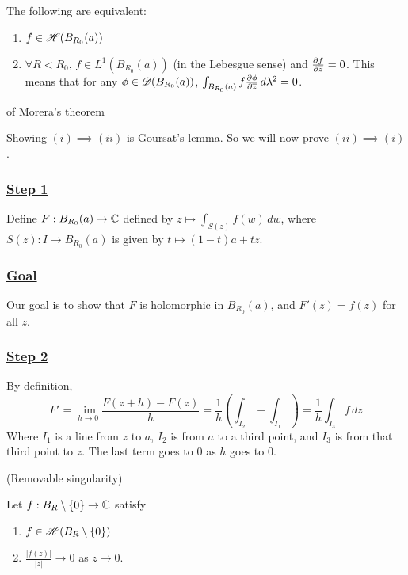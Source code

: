 \documentclass[x11names,reqno,14pt]{extarticle}
\begin{document}
\thm 

The following are equivalent: 
\begin{enumerate}[label=(\alph*)]
\item $f \in \mathscr{H}(B_{R_0}(a))$ 
\item $\forall R < R_0$, $f \in L^1(B_{R_0}(a))$ (in the Lebesgue sense) and $\frac{\partial f}{\partial \overline{z}} = 0$. This means that for any $\phi \in \mathscr{D}(B_{R_0}(a))$, $\int_{B_{R_0}(a)}f\frac{\partial \phi}{\partial \overline{z}}\,d\lambda^2 = 0 $. 
\end{enumerate}

\proof of Morera's theorem

Showing $(i) \implies (ii)$ is Goursat's lemma. So we will now prove $(ii) \implies (i)$. 

\subsubsection*{\underline{Step 1}}

Define $F:B_{R_0}(a)\to\mathbb{C}$ defined by $z\mapsto\int_{S(z)}f(w)\,dw$, where $S(z): I\to B_{R_0}(a)$ is given by $t \mapsto (1 - t)a + tz$.

\subsubsection*{\underline{Goal}}

Our goal is to show that $F$ is holomorphic in $B_{R_0}(a)$, and $F'(z) = f(z)$ for all $z$. 

\subsubsection*{\underline{Step 2}}

By definition, 
\[
F' = \lim_{h\to0}\frac{F(z + h) - F(z)}{h} = \frac{1}{h}(\int_{I_2} + \int_{I_1}) = \frac{1}{h}\int_{I_3}f\,dz
\]
Where $I_1$ is a line from $z$ to $a$, $I_2$ is from $a$ to a third point, and $I_3$ is from that third point to $z$. The last term goes to $0$ as $h$ goes to $0$. 


\thm (Removable singularity) 

Let $f:B_R\setminus\{0\}\to\mathbb{C}$ satisfy 
\begin{enumerate}[label=(\alph*)]
\item $f \in \mathscr{H}(B_R\setminus\{0\})$
\item $\frac{|f(z)|}{|z|}\to0$ as $z\to0$. 
\end{enumerate}
\end{document}

